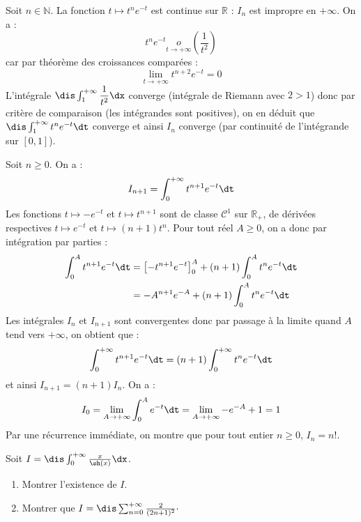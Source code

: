 \documentclass[a4paper,10pt]{report}
\begin{document}
\corr Soit $n \in \mathbb{N}$. La fonction $t \mapsto  t^ne^{-t}$ est continue sur $\mathbb{R}$ : $I_n$ est impropre en $+ \infty$. On a :
$$ t^n e^{-t} \underset{t \rightarrow +\infty} o \left( \dfrac{1}{t^2} \right)$$
car par théorème des croissances comparées :
$$ \lim_{t \rightarrow + \infty} t^{n+2} e^{-t}=0$$
L'intégrale $\dis \int_1^{+ \infty} \dfrac{1}{t^2} \dx$ converge (intégrale de Riemann avec $2>1$) donc par critère de comparaison (les intégrandes sont positives), on en déduit que $\dis \int_1^{+ \infty} t^n e^{-t} \dt$ converge et ainsi $I_n$ converge (par continuité de l'intégrande sur $[0,1]$).

\medskip

\noindent Soit $n \geq 0$. On a :
$$ I_{n+1} = \int_0^{+ \infty} t^{n+1} e^{-t} \dt$$
Les fonctions $t \mapsto -e^{-t}$ et $t \mapsto t^{n+1}$ sont de classe $\mathcal{C}^1$ sur $\mathbb{R}_+$, de dérivées respectives $t \mapsto e^{-t}$ et $t \mapsto (n+1)t^n$. Pour tout réel $A \geq 0$, on a donc par intégration par parties :
\begin{align*}
\int_0^A t^{n+1} e^{-t} \dt & = \left[- t^{n+1} e^{-t} \right]_0^A +  (n+1) \int_0^A t^{n} e^{-t} \dt \\
& = -A^{n+1} e^{-A} +  (n+1) \int_0^A t^{n} e^{-t} \dt
\end{align*}
Les intégrales $I_n$ et $I_{n+1}$ sont convergentes donc par passage à la limite quand $A$ tend vers $+ \infty$, on obtient que :
$$ \int_0^{+ \infty} t^{n+1} e^{-t} \dt = (n+1)\int_0^{+ \infty} t^{n} e^{-t} \dt$$
et ainsi $I_{n+1}=(n+1) I_n$. On a :
$$ I_0 = \lim_{A \rightarrow + \infty} \int_0^A e^{-t} \dt = \lim_{A \rightarrow + \infty} -e^{-A}+1 = 1$$
Par une récurrence immédiate, on montre que pour tout entier $n \geq 0$, $I_n=n!$.

\begin{Exa}\label{gamma} Soit $I = \dis \int_{0}^{+ \infty} \frac{x}{\sh(x)} \dx$.

\begin{enumerate}
\item Montrer l'existence de $I$.
\item Montrer que $I= \dis \sum_{n=0}^{+ \infty} \frac{2}{(2n+1)^2}\cdot$
\end{enumerate}
\end{Exa} 

\corr 
\end{document}
